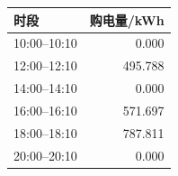 \begin{tabular}{lr}
\toprule
时段 & 购电量/kWh \\
\midrule
10:00--10:10 & 0.000 \\
12:00--12:10 & 495.788 \\
14:00--14:10 & 0.000 \\
16:00--16:10 & 571.697 \\
18:00--18:10 & 787.811 \\
20:00--20:10 & 0.000 \\
\bottomrule
\end{tabular}
